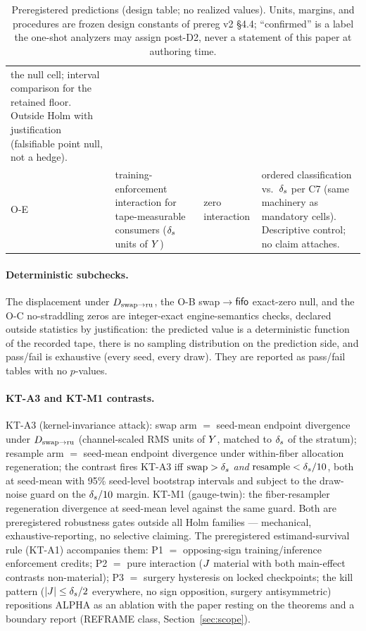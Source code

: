 \begin{table}[t]
\begin{tabular}{p{2.0cm}p{4.4cm}p{4.4cm}p{3.1cm}}
the null cell; interval comparison for the retained floor. Outside Holm with
justification (falsifiable point null, not a hedge). \\
O-E & training-enforcement interaction for tape-measurable consumers
($\delta_{s}$ units of $Y$) & zero interaction & ordered classification vs.\
$\delta_{s}$ per C7 (same machinery as mandatory cells). Descriptive control;
no claim attaches. \\
\bottomrule
\end{tabular}
\caption{Preregistered predictions (design table; no realized values).
Units, margins, and procedures are frozen design constants of prereg v2
\S4.4; ``confirmed'' is a label the one-shot analyzers may assign post-D2,
never a statement of this paper at authoring time.}
\label{tab:opredictions}
\end{table}

\paragraph{Deterministic subchecks.}
The  displacement under $D_{\mathrm{swap}\to\mathrm{ru}}$, the O-B
swap$\to$$\mathsf{fifo}$ exact-zero null, and the O-C no-straddling zeros are
integer-exact engine-semantics checks, declared outside statistics by
justification: the predicted value is a deterministic function of the
recorded tape, there is no sampling distribution on the prediction side, and
pass/fail is exhaustive (every seed, every draw). They are reported as
pass/fail tables with no $p$-values.

\paragraph{KT-A3 and KT-M1 contrasts.}
KT-A3 (kernel-invariance attack): swap arm $=$ seed-mean endpoint divergence
under $D_{\mathrm{swap}\to\mathrm{ru}}$ (channel-scaled RMS units of $Y$, matched to $\delta_{s}$
of the stratum); resample arm $=$ seed-mean endpoint divergence under
within-fiber allocation regeneration; the contrast fires KT-A3 iff
$\mathrm{swap} > \delta_{s}$ \emph{and} $\mathrm{resample} < \delta_{s}/10$, both
at seed-mean with 95\% seed-level bootstrap intervals and subject to the
draw-noise guard on the $\delta_{s}/10$ margin. KT-M1 (gauge-twin): the
fiber-resampler regeneration divergence at seed-mean level against the same
guard. Both are preregistered robustness gates outside all Holm families ---
mechanical, exhaustive-reporting, no selective claiming. The preregistered
estimand-survival rule (KT-A1) accompanies them: P1 $=$ opposing-sign
training/inference enforcement credits; P2 $=$ pure interaction ($J$
material with both main-effect contrasts non-material); P3 $=$ surgery
hysteresis on locked checkpoints; the kill pattern ($|J| \le \delta_{s}/2$
everywhere, no sign opposition, surgery antisymmetric) repositions ALPHA as
an ablation with the paper resting on the theorems and a boundary report
(REFRAME class, Section~\ref{sec:scope}).

